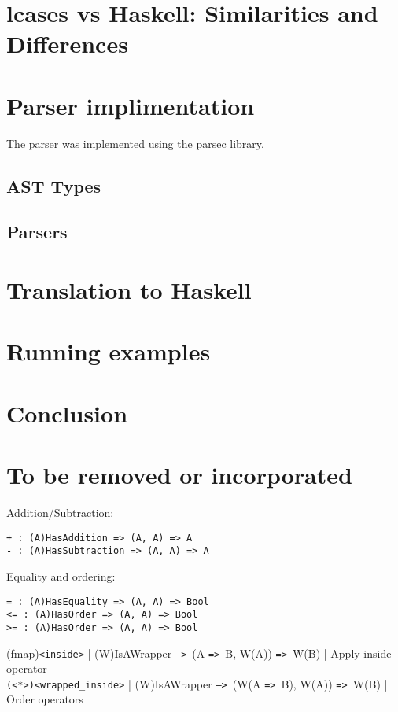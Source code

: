 \documentclass{article}
\def\H{Haskell}
\def\ra{\texttt{=>}\ }
\def\Ra{\texttt{-->}\ }
\begin{document}
\section{lcases vs Haskell: Similarities and Differences}

\section{Parser implimentation}

The parser was implemented using the parsec library.

\subsection{AST Types}

\subsection{Parsers}

\section{Translation to \H}
\section{Running examples}
\section{Conclusion}

\section{To be removed or incorporated}

Addition/Subtraction:
\begin{verbatim}
+ : (A)HasAddition => (A, A) => A
- : (A)HasSubtraction => (A, A) => A
\end{verbatim}
Equality and ordering:
\begin{verbatim}
= : (A)HasEquality => (A, A) => Bool
<= : (A)HasOrder => (A, A) => Bool
>= : (A)HasOrder => (A, A) => Bool
\end{verbatim}

(fmap)\texttt{<inside>} | (W)IsAWrapper \Ra (A \ra B, W(A)) \ra W(B) | Apply inside operator \\
\texttt{(<*>)<wrapped_inside>} | (W)IsAWrapper \Ra (W(A \ra B), W(A)) \ra W(B) | Order operators \\
\end{document}
